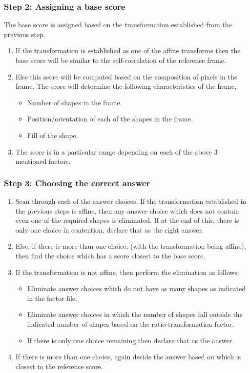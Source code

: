 \documentclass[10pt, letter]{article}
\begin{document}
\subsubsection*{Step 2: Assigning a base score}
The base score is assigned based on the transformation established from the previous step.
\begin{enumerate}
	\item If the transformation is established as one of the affine transforms then the base score will be similar to the self-correlation of the reference frame.
	\item Else this score will be computed based on the composition of pixels in the frame. The score will determine the following characteristics of the frame,
		\begin{itemize}
			\item Number of shapes in the frame.
			\item Position/orientation of each of the shapes in the frame.
			\item Fill of the shape.
		\end{itemize}
	\item The score is in a particular range depending on each of the above 3 mentioned factors.
\end{enumerate}

\subsubsection*{Step 3: Choosing the correct answer}
\begin{enumerate}
\item Scan through each of the answer choices. If the transformation established in the previous steps is affine, then any answer choice which does not contain even one of the required shapes is eliminated. If at the end of this, there is only one choice in contention, declare that as the right answer.
\item Else, if there is more than one choice, (with the transformation being affine), then find the choice which has a score closest to the base score.
\item If the transformation is not affine, then perform the elimination as follows:
	\begin{itemize}
		\item Eliminate answer choices which do not have as many shapes as indicated in the factor file.
		\item Eliminate answer choices in which the number of shapes fall outside the indicated number of shapes based on the ratio transformation factor.
		\item If there is only one choice remaining then declare that as the answer.
	\end{itemize}
\item If there is more than one choice, again decide the answer based on which is closest to the reference score.
\end{enumerate}
\end{document}
